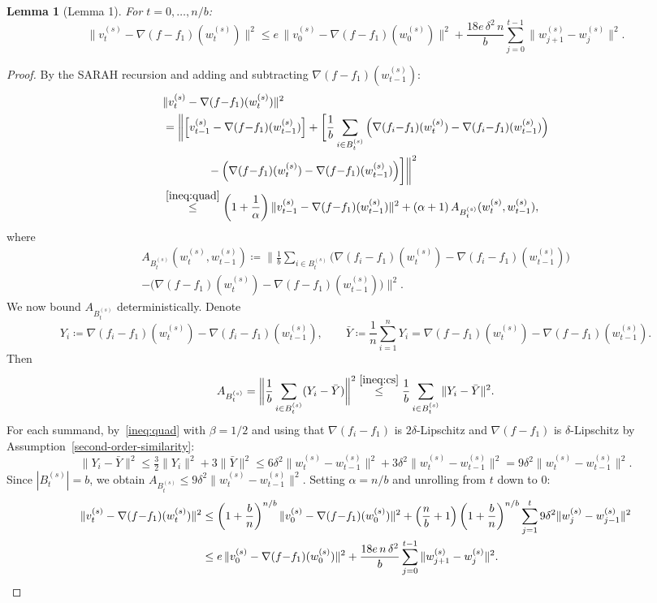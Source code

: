 \documentclass{article}
\newtheorem{lemma}{Lemma}
\begin{document}
\begin{lemma}[Lemma 1]
For $t = 0, \ldots, n/b$:
\[
\|v_t^{(s)} - \nabla(f{-}f_1)(w_t^{(s)})\|^2
\leq e\,\|v_0^{(s)} - \nabla(f{-}f_1)(w_0^{(s)})\|^2
+ \frac{18e\,\delta^2\,n}{b}
\sum_{j=0}^{t-1}\|w_{j+1}^{(s)} - w_j^{(s)}\|^2.
\]
\end{lemma}
\begin{proof}
By the SARAH recursion and adding and subtracting 
$\nabla(f{-}f_1)(w_{t-1}^{(s)})$:
\begin{align*}
&\|v_t^{(s)} - \nabla(f{-}f_1)(w_t^{(s)})\|^2 \\
&= \bigg\|\Big[v_{t-1}^{(s)} - \nabla(f{-}f_1)(w_{t-1}^{(s)})\Big] 
+ \bigg[\frac{1}{b}\sum_{i \in B_t^{(s)}}
\Big(\nabla(f_i{-}f_1)(w_t^{(s)}) 
  - \nabla(f_i{-}f_1)(w_{t-1}^{(s)})\Big) \\
&\qquad\qquad - \Big(\nabla(f{-}f_1)(w_t^{(s)}) 
  - \nabla(f{-}f_1)(w_{t-1}^{(s)})\Big)\bigg]\bigg\|^2 \\
&\overset{\eqref{ineq:quad}}{\leq} \left(1 + \frac{1}{\alpha}\right)
\|v_{t-1}^{(s)} - \nabla(f{-}f_1)(w_{t-1}^{(s)})\|^2 
+ (\alpha + 1)\,A_{B_t^{(s)}}(w_t^{(s)}, w_{t-1}^{(s)}),
\end{align*}
where
\begin{multline*}
A_{B_t^{(s)}}(w_t^{(s)}, w_{t-1}^{(s)}) 
\coloneqq \bigg\|\frac{1}{b}\sum_{i \in B_t^{(s)}}
\Big(\nabla(f_i{-}f_1)(w_t^{(s)}) 
  - \nabla(f_i{-}f_1)(w_{t-1}^{(s)})\Big) \\
- \Big(\nabla(f{-}f_1)(w_t^{(s)}) 
  - \nabla(f{-}f_1)(w_{t-1}^{(s)})\Big)\bigg\|^2.
\end{multline*}
We now bound $A_{B_t^{(s)}}$ deterministically. Denote 
\[
Y_i \coloneqq \nabla(f_i{-}f_1)(w_t^{(s)}) 
  - \nabla(f_i{-}f_1)(w_{t-1}^{(s)}), 
\qquad 
\bar{Y} \coloneqq \frac{1}{n}\sum_{i=1}^{n} Y_i 
= \nabla(f{-}f_1)(w_t^{(s)}) 
  - \nabla(f{-}f_1)(w_{t-1}^{(s)}).
\]
Then
\[
A_{B_t^{(s)}} 
= \bigg\|\frac{1}{b}\sum_{i \in B_t^{(s)}} (Y_i - \bar{Y})\bigg\|^2 
\overset{\eqref{ineq:cs}}{\leq} 
\frac{1}{b}\sum_{i \in B_t^{(s)}} \|Y_i - \bar{Y}\|^2.
\]
For each summand, by~\eqref{ineq:quad} with $\beta = 1/2$ 
and using that $\nabla(f_i - f_1)$ is $2\delta$-Lipschitz 
and $\nabla(f - f_1)$ is $\delta$-Lipschitz 
by Assumption~\ref{second-order-similarity}:
\[
\|Y_i - \bar{Y}\|^2 
\leq \tfrac{3}{2}\|Y_i\|^2 + 3\|\bar{Y}\|^2 
\leq 6\delta^2\|w_t^{(s)} - w_{t-1}^{(s)}\|^2 
+ 3\delta^2\|w_t^{(s)} - w_{t-1}^{(s)}\|^2 
= 9\delta^2\|w_t^{(s)} - w_{t-1}^{(s)}\|^2.
\]
Since $|B_t^{(s)}| = b$, we obtain 
$A_{B_t^{(s)}} \leq 9\delta^2\|w_t^{(s)} - w_{t-1}^{(s)}\|^2$.
Setting $\alpha = n/b$ and unrolling from $t$ down to $0$:
\begin{align*}
\|v_t^{(s)} - \nabla(f{-}f_1)(w_t^{(s)})\|^2
&\leq \left(1 + \frac{b}{n}\right)^{n/b}
\|v_0^{(s)} - \nabla(f{-}f_1)(w_0^{(s)})\|^2 
+ \left(\frac{n}{b} + 1\right)\left(1 + \frac{b}{n}\right)^{n/b}
\sum_{j=1}^{t} 9\delta^2\|w_j^{(s)} - w_{j-1}^{(s)}\|^2 \\
& \leq e\,\|v_0^{(s)} - \nabla(f{-}f_1)(w_0^{(s)})\|^2 
+ \frac{18e\,n\,\delta^2}{b}
\sum_{j=0}^{t-1}\|w_{j+1}^{(s)} - w_j^{(s)}\|^2.
\qedhere
\end{align*}
\end{proof}
\end{document}
